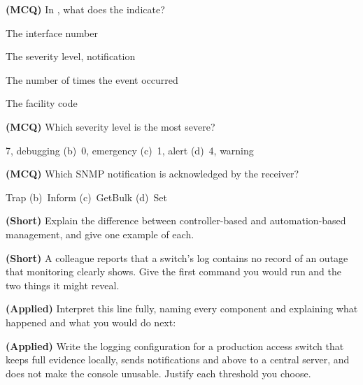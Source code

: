 \begin{reviewq}
  \item \textbf{(MCQ)} In , what does the 
        indicate?
        \begin{tight}
          \item[(a)] The interface number
          \item[(b)] The severity level, notification
          \item[(c)] The number of times the event occurred
          \item[(d)] The facility code
        \end{tight}
  \item \textbf{(MCQ)} Which severity level is the most severe?
        \begin{tight}
          \item[(a)] 7, debugging \quad (b)~0, emergency
          \quad (c)~1, alert \quad (d)~4, warning
        \end{tight}
  \item \textbf{(MCQ)} Which SNMP notification is acknowledged by the receiver?
        \begin{tight}
          \item[(a)] Trap \quad (b)~Inform \quad (c)~GetBulk \quad (d)~Set
        \end{tight}
  \item \textbf{(Short)} Explain the difference between controller-based and
        automation-based management, and give one example of each.
  \item \textbf{(Short)} A colleague reports that a switch's log contains no
        record of an outage that monitoring clearly shows. Give the first command
        you would run and the two things it might reveal.
  \item \textbf{(Applied)} Interpret this line fully, naming every component and
        explaining what happened and what you would do next:
  \item \textbf{(Applied)} Write the logging configuration for a production access
        switch that keeps full evidence locally, sends notifications and above to
        a central server, and does not make the console unusable. Justify each
        threshold you choose.
\end{reviewq}
